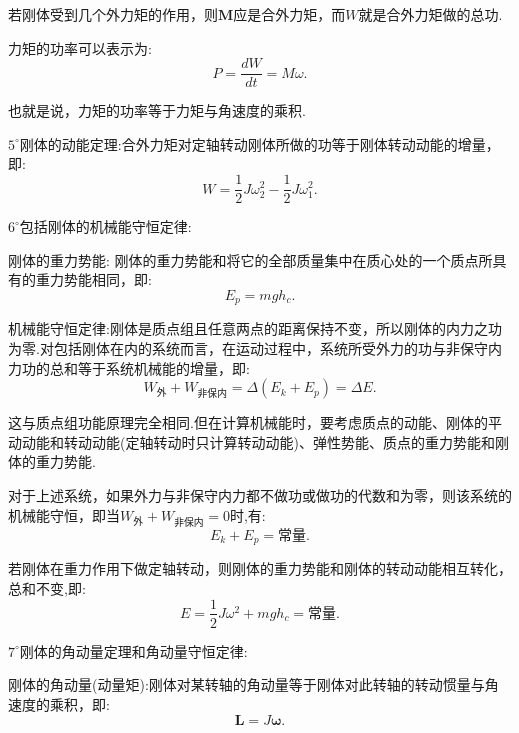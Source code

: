 \documentclass[UTF8]{ctexart}
\begin{document}
	若刚体受到几个外力矩的作用，则${\boldsymbol M}$应是合外力矩，而$W$就是合外力矩做的总功.

	力矩的功率可以表示为:
	\begin{equation*}
		P=\frac{dW}{dt}=M\omega.
	\end{equation*}
	
	也就是说，力矩的功率等于力矩与角速度的乘积.

	$5^{\circ}$刚体的动能定理:合外力矩对定轴转动刚体所做的功等于刚体转动动能的增量，即:
	\begin{equation*}
		W=\frac{1}{2}J\omega_2^2-\frac{1}{2}J\omega_1^2.
	\end{equation*}

	$6^{\circ}$包括刚体的机械能守恒定律:

	刚体的重力势能: 刚体的重力势能和将它的全部质量集中在质心处的一个质点所具有的重力势能相同，即:
	\begin{equation*}
		E_p=mgh_c.
	\end{equation*}

	机械能守恒定律:刚体是质点组且任意两点的距离保持不变，所以刚体的内力之功为零.对包括刚体在内的系统而言，在运动过程中，系统所受外力的功与非保守内力功的总和等于系统机械能的增量，即:
	\begin{equation*}
		W_{\text{外}}+W_{\text{非保内}}=\Delta (E_k+E_p)=\Delta E.
	\end{equation*}
	
	这与质点组功能原理完全相同.但在计算机械能时，要考虑质点的动能、刚体的平动动能和转动动能(定轴转动时只计算转动动能)、弹性势能、质点的重力势能和刚体的重力势能.
	
	对于上述系统，如果外力与非保守内力都不做功或做功的代数和为零，则该系统的机械能守恒，即当$W_{\text{外}}+W_{\text{非保内}}=0$时,有:
	\begin{equation*}
		E_k+E_p=\text{常量}.
	\end{equation*}
	
	若刚体在重力作用下做定轴转动，则刚体的重力势能和刚体的转动动能相互转化，总和不变,即:
	\begin{equation*}
		E=\frac{1}{2}J\omega^2+mgh_c=\text{常量}.
	\end{equation*}

	$7^{\circ}$刚体的角动量定理和角动量守恒定律:
	
	刚体的角动量(动量矩):刚体对某转轴的角动量等于刚体对此转轴的转动惯量与角速度的乘积，即:
	\begin{equation*}
		{\boldsymbol L}=J{\boldsymbol \omega}.
	\end{equation*}
\end{document}
